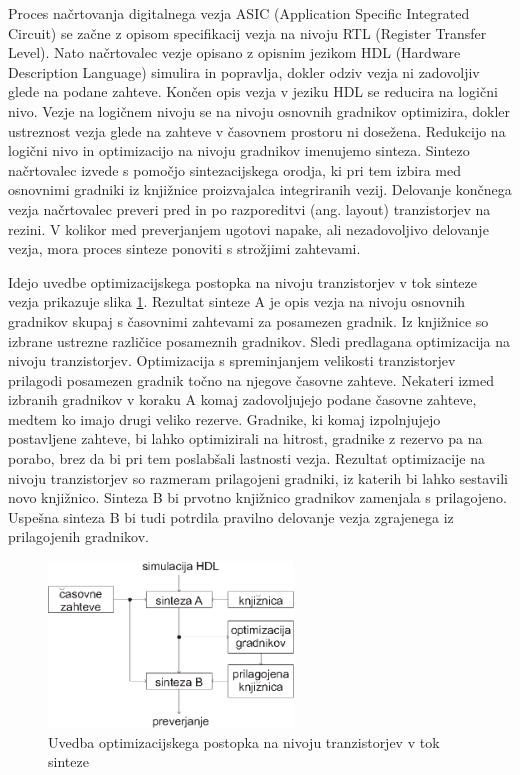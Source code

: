 \documentclass[journal,a4paper,twoside]{sty/IEEEtran}
\begin{document}
Proces načrtovanja digitalnega vezja ASIC (Application Specific Integrated Circuit) se začne z opisom specifikacij vezja na nivoju RTL (Register Transfer Level). Nato načrtovalec vezje opisano z opisnim jezikom HDL (Hardware Description Language) simulira in popravlja, dokler odziv vezja ni zadovoljiv glede na podane zahteve. Končen opis vezja v jeziku HDL se reducira na logični nivo. Vezje na logičnem nivoju se na nivoju osnovnih gradnikov optimizira, dokler ustreznost vezja glede na zahteve v časovnem prostoru ni dosežena. Redukcijo na logični nivo in optimizacijo na nivoju gradnikov imenujemo sinteza. Sintezo načrtovalec izvede s pomočjo sintezacijskega orodja, ki pri tem izbira med osnovnimi gradniki iz knjižnice proizvajalca integriranih vezij. Delovanje končnega vezja načrtovalec preveri pred in po razporeditvi (ang. layout) tranzistorjev na rezini. V kolikor med preverjanjem ugotovi napake, ali nezadovoljivo delovanje vezja, mora proces sinteze ponoviti s strožjimi zahtevami.

Idejo uvedbe optimizacijskega postopka na nivoju tranzistorjev v tok sinteze vezja prikazuje slika \ref{synthesis_step}. Rezultat sinteze A je opis vezja na nivoju osnovnih gradnikov skupaj s časovnimi zahtevami za posamezen gradnik. Iz knjižnice so izbrane ustrezne različice posameznih gradnikov. Sledi predlagana optimizacija na nivoju tranzistorjev. Optimizacija s spreminjanjem velikosti tranzistorjev prilagodi posamezen gradnik točno na njegove časovne zahteve. Nekateri izmed izbranih gradnikov v koraku A komaj zadovoljujejo podane časovne zahteve, medtem ko imajo drugi veliko rezerve. Gradnike, ki komaj izpolnjujejo postavljene zahteve, bi lahko optimizirali na hitrost, gradnike z rezervo pa na porabo, brez da bi pri tem poslabšali lastnosti vezja. Rezultat optimizacije na nivoju tranzistorjev so razmeram prilagojeni gradniki, iz katerih bi lahko sestavili novo knjižnico. Sinteza B bi prvotno knjižnico gradnikov zamenjala s prilagojeno. Uspešna sinteza B bi tudi potrdila pravilno delovanje vezja zgrajenega iz prilagojenih gradnikov.

\begin{figure}[htb]
\centerline{\includegraphics[width=6.5cm]{fig/synthesis_step_slo}}
\caption{Uvedba optimizacijskega postopka na nivoju tranzistorjev v tok sinteze}
\label{synthesis_step}
\end{figure}
\end{document}
